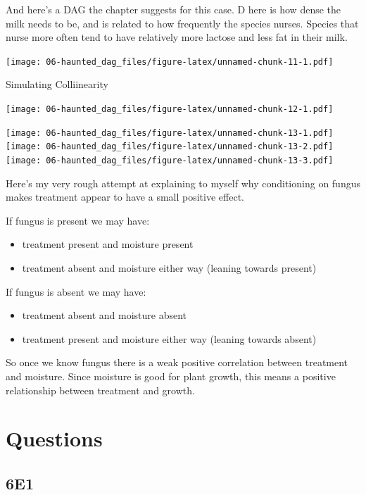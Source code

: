 \documentclass[
]{book}
\providecommand{\tightlist}{%
  \setlength{\itemsep}{0pt}\setlength{\parskip}{0pt}}
\begin{document}
And here's a DAG the chapter suggests for this case. D here is how dense the milk needs to be, and is related to how frequently the species nurses. Species that nurse more often tend to have relatively more lactose and less fat in their milk.

\texttt{[image: 06-haunted\_dag\_files/figure-latex/unnamed-chunk-11-1.pdf]}

Simulating Colliinearity

\texttt{[image: 06-haunted\_dag\_files/figure-latex/unnamed-chunk-12-1.pdf]}

\texttt{[image: 06-haunted\_dag\_files/figure-latex/unnamed-chunk-13-1.pdf]} \texttt{[image: 06-haunted\_dag\_files/figure-latex/unnamed-chunk-13-2.pdf]} \texttt{[image: 06-haunted\_dag\_files/figure-latex/unnamed-chunk-13-3.pdf]}

Here's my very rough attempt at explaining to myself why conditioning on fungus makes treatment appear to have a small positive effect.

If fungus is present we may have:

\begin{itemize}
\tightlist
\item
  treatment present and moisture present
\item
  treatment absent and moisture either way (leaning towards present)
\end{itemize}

If fungus is absent we may have:

\begin{itemize}
\tightlist
\item
  treatment absent and moisture absent
\item
  treatment present and moisture either way (leaning towards absent)
\end{itemize}

So once we know fungus there is a weak positive correlation between treatment and moisture. Since moisture is good for plant growth, this means a positive relationship between treatment and growth.

\hypertarget{questions-5}{%
\section{Questions}\label{questions-5}}

\hypertarget{e1-4}{%
\subsection*{6E1}\label{e1-4}}
\end{document}
